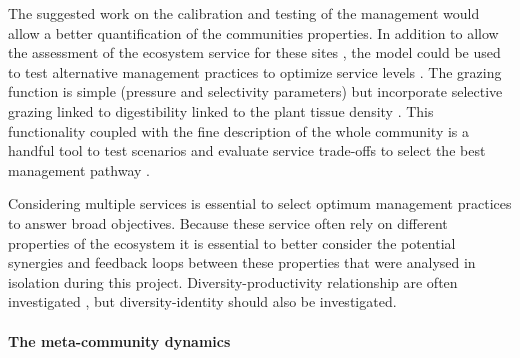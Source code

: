 The suggested work on the calibration and testing of the management would allow a better quantification of the communities properties. In addition to allow the assessment of the ecosystem service for these sites \parencite{bello_towards_2010, lavorel_using_2011}, the model could be used to test alternative management practices to optimize service levels \parencite{goslee_optimizing_2013}. The grazing function is simple (pressure and selectivity parameters) but incorporate selective grazing linked to digestibility linked to the plant tissue density \parencite{gardarin_plant_2014}. This functionality coupled with the fine description of the whole community is a handful tool to test scenarios and evaluate service trade-offs to select the best management pathway \parencite{lafond_reconciling_2015}.

Considering multiple services is essential to select optimum management practices to answer broad objectives. Because these service often rely on different properties of the ecosystem \parencite{lavorel_how_2012, lamarque_plant_2014} it is essential to better consider the potential synergies and feedback loops between these properties that were analysed in isolation during this project. Diversity-productivity relationship are often investigated \parencite{tilman_diversity_2001, lepik_high_2005}, but diversity-identity \parencite{zuppinger-dingley_selection_2014} should also be investigated.
%

\paragraph{The meta-community dynamics}

